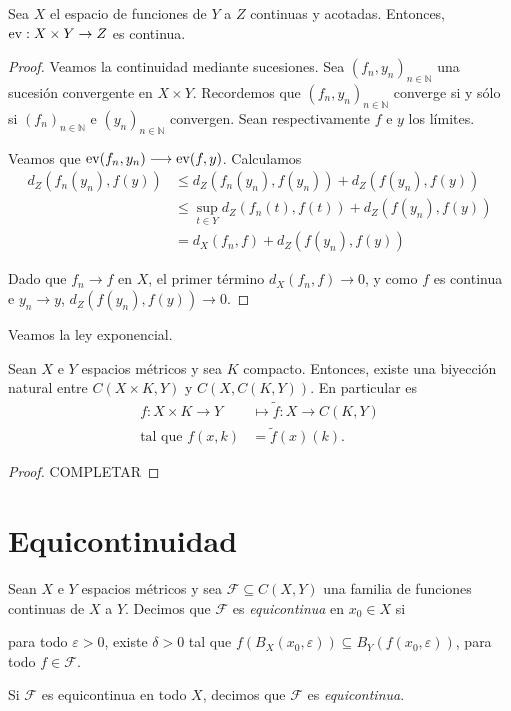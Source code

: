 \begin{proposition}
	Sea $X$ el espacio de funciones de $Y$ a $Z$ continuas y acotadas. Entonces, $\operatorname{ev} : X \times Y \to Z$ es continua.
\end{proposition}

\begin{proof}
	Veamos la continuidad mediante sucesiones. Sea $(f_n, y_n)_{n \in \mathbb{N}}$ una sucesión convergente en $X \times Y$. Recordemos que $(f_n, y_n)_{n \in \mathbb{N}}$ converge si y sólo si $(f_n)_{n \in \mathbb{N}}$ e $(y_n)_{n \in \mathbb{N}}$ convergen. Sean respectivamente $f$ e $y$ los límites.

	Veamos que $\operatorname{ev}(f_n, y_n) \longrightarrow \operatorname{ev}(f, y)$. Calculamos
	\begin{align*}
		d_Z(f_n(y_n), f(y)) & \leq d_Z(f_n(y_n), f(y_n)) + d_Z(f(y_n), f(y))            \\
		                    & \leq \sup_{t \in Y} d_Z(f_n(t), f(t)) + d_Z(f(y_n), f(y)) \\
		                    & = d_X(f_n, f) + d_Z(f(y_n), f(y))
	\end{align*}

	Dado que $f_n \to f$ en $X$, el primer término $d_X(f_n, f) \longrightarrow 0$, y como $f$ es continua e $y_n \longrightarrow y$, $d_Z(f(y_n), f(y)) \longrightarrow 0$.
\end{proof}

Veamos la ley exponencial.

\begin{proposition}
	Sean $X$ e $Y$ espacios métricos y sea $K$ compacto. Entonces, existe una biyección natural entre $C(X \times K, Y)$ y $C(X, C(K, Y))$. En particular es
	\begin{align*}
		f : X \times K \to Y   & \mapsto \tilde{f} : X \to C(K, Y) \\
		\text{tal que }f(x, k) & = \tilde{f}(x)(k).
	\end{align*}
\end{proposition}

\begin{proof}
	\color{red} COMPLETAR
\end{proof}

\section{Equicontinuidad}

\begin{definition}
	Sean $X$ e $Y$ espacios métricos y sea $\mathcal{F} \subseteq C(X, Y)$ una familia de funciones continuas de $X$ a $Y$. Decimos que $\mathcal{F}$ es \emph{equicontinua} en $x_0 \in X$ si
	\begin{center}
		\begin{minipage}{0.9\linewidth}
			para todo $\varepsilon > 0$, existe $\delta > 0$ tal que $f(B_X(x_0, \varepsilon)) \subseteq B_Y(f(x_0, \varepsilon))$, para todo $f \in \mathcal{F}$.
		\end{minipage}
	\end{center}
	Si $\mathcal{F}$ es equicontinua en todo $X$, decimos que $\mathcal{F}$ es \emph{equicontinua}.
\end{definition}

